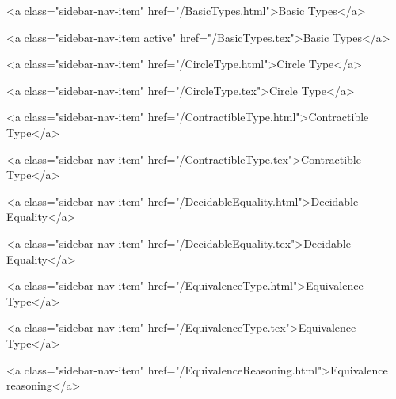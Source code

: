           <a class="sidebar-nav-item" href="/BasicTypes.html">Basic Types</a>
        
      
    
      
        
          <a class="sidebar-nav-item active" href="/BasicTypes.tex">Basic Types</a>
        
      
    
      
        
          <a class="sidebar-nav-item" href="/CircleType.html">Circle Type</a>
        
      
    
      
        
          <a class="sidebar-nav-item" href="/CircleType.tex">Circle Type</a>
        
      
    
      
        
          <a class="sidebar-nav-item" href="/ContractibleType.html">Contractible Type</a>
        
      
    
      
        
          <a class="sidebar-nav-item" href="/ContractibleType.tex">Contractible Type</a>
        
      
    
      
        
          <a class="sidebar-nav-item" href="/DecidableEquality.html">Decidable Equality</a>
        
      
    
      
        
          <a class="sidebar-nav-item" href="/DecidableEquality.tex">Decidable Equality</a>
        
      
    
      
        
          <a class="sidebar-nav-item" href="/EquivalenceType.html">Equivalence Type</a>
        
      
    
      
        
          <a class="sidebar-nav-item" href="/EquivalenceType.tex">Equivalence Type</a>
        
      
    
      
        
          <a class="sidebar-nav-item" href="/EquivalenceReasoning.html">Equivalence reasoning</a>
        
      
    
